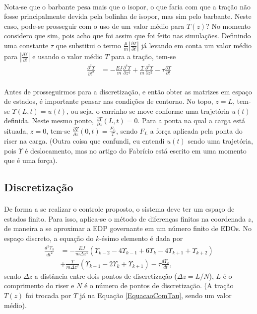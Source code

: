 \documentclass[a4paper,11pt]{scrartcl} %
\numberwithin{equation}{section} %
\numberwithin{figure}{section} %
\numberwithin{table}{section} %
\begin{document}
\paragraph{} Nota-se que o barbante pesa mais que o isopor, o que faria com que a tração não fosse principalmente devida pela bolinha de isopor, mas sim pelo barbante. Neste caso, pode-se prosseguir com o uso de um valor médio para $T(z)$? No momento considero que sim, pois acho que foi assim que foi feito nas simulações. Definindo uma constante $\tau$ que substitui o termo $\frac{\mu}{m}\left|\frac{\partial \Upsilon}{\partial t}\right|$ já levando em conta um valor médio para $\left|\frac{\partial \Upsilon}{\partial t}\right|$ e usando o valor médio $T$ para a tração, tem-se \begin{align}
	\frac{\partial^2 \Upsilon}{\partial t^2} &= -\frac{EJ}{m}\frac{\partial^4 \Upsilon}{\partial z^4} + \frac{T}{m}\frac{\partial^2 \Upsilon}{\partial z^2} - \tau\frac{\partial \Upsilon}{\partial t}\label{EquacaoComTau}
	\end{align}
	
\paragraph{} Antes de prosseguirmos para a discretização, e então obter as matrizes em espaço de estados, é importante pensar nas condições de contorno. No topo, $z=L$, tem-se $\Upsilon(L,t)=u(t)$, ou seja, o carrinho se move conforme uma trajetória $u(t)$ definida. Neste mesmo ponto, $\frac{\partial\Upsilon}{\partial z}(L,t) = 0$. Para a ponta na qual a carga está situada, $z=0$, tem-se $\frac{\partial\Upsilon}{\partial z}(0,t) = \frac{F_L}{T}$, sendo $F_L$ a força aplicada pela ponta do riser na carga. (Outra coisa que confundi, eu entendi $u(t)$ sendo uma trajetória, pois $\Upsilon$ é deslocamento, mas no artigo do Fabrício está escrito em uma momento que é uma força).

\subsection{Discretização}
\paragraph{} De forma a se realizar o controle proposto, o sistema deve ter um espaço de estados finito. Para isso, aplica-se o método de diferenças finitas na coordenada $z$, de maneira a se aproximar a EDP governante em um número finito de EDOs. No espaço discreto, a equação do $k$-ésimo elemento é dada por \begin{align}
	\frac{d^2\Upsilon_k}{dt^2} &= -\frac{EJ}{m\Delta z^4}\left(\Upsilon_{k-2} - 4\Upsilon_{k-1}+6\Upsilon_{k}-4\Upsilon_{k+1}+\Upsilon_{k+2}\right)\nonumber\\
	&+ \frac{T}{m\Delta z^2}\left(\Upsilon_{k-1}-2\Upsilon_{k} + \Upsilon_{k+1}\right)-\tau\frac{d\Upsilon_k}{dt},
\end{align} sendo $\Delta z$ a distância entre dois pontos de discretização ($\Delta z = L/N$), $L$ é o comprimento do riser e $N$ é o número de pontos de discretização. (A tração $T(z)$ foi trocada por $T$ já na Equação  \ref{EquacaoComTau}, sendo um valor médio).
\end{document}
